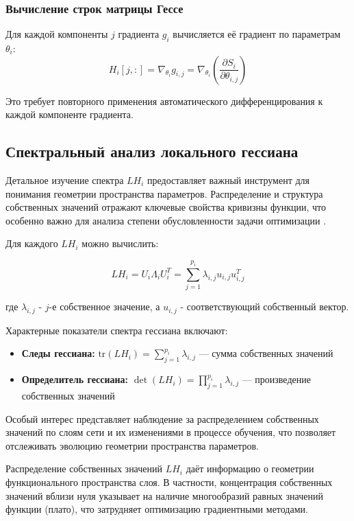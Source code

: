 \documentclass[a4paper,12pt]{article}
\begin{document}
\subsubsection{Вычисление строк матрицы Гессе}
Для каждой компоненты $j$ градиента $g_i$ вычисляется её градиент по параметрам $\theta_i$:
\begin{equation}
  H_i[j,:] = \nabla_{\theta_i} g_{i,j} = \nabla_{\theta_i} \left( \frac{\partial S_i}{\partial \theta_{i,j}} \right)
\end{equation}

Это требует повторного применения автоматического дифференцирования к каждой компоненте градиента.

\subsection{Спектральный анализ локального гессиана}

Детальное изучение спектра $LH_i$ предоставляет важный инструмент для понимания геометрии пространства
параметров. Распределение и структура собственных значений отражают ключевые свойства кривизны
функции, что особенно важно для анализа степени обусловленности задачи оптимизации \cite{sagun2016,
liaomahoney2021}.

Для каждого $LH_i$ можно вычислить:

\begin{equation}
  LH_i = U_i\Lambda_i U_i^T = \sum_{j=1}^{p_i} \lambda_{i,j} u_{i,j} u_{i,j}^T
\end{equation}

где $\lambda_{i,j}$ - $j$-е собственное значение, а $u_{i,j}$ - соответствующий собственный вектор.

Характерные показатели спектра гессиана включают:

\begin{itemize}
  \item \textbf{Следы гессиана:} $\text{tr}(LH_i) = \sum_{j=1}^{p_i} \lambda_{i,j}$ — сумма собственных
    значений
  \item \textbf{Определитель гессиана:} $\det(LH_i) = \prod_{j=1}^{p_i} \lambda_{i,j}$ — произведение
    собственных значений
\end{itemize}

Особый интерес представляет наблюдение за распределением собственных значений по слоям сети и их изменениями в
процессе обучения, что позволяет отслеживать эволюцию геометрии пространства параметров.

Распределение собственных значений $LH_i$ даёт информацию о геометрии функционального пространства слоя. В
частности, концентрация собственных значений вблизи нуля указывает на наличие многообразий равных
значений функции (плато), что затрудняет оптимизацию градиентными методами.
\end{document}
